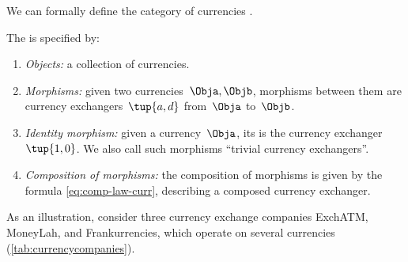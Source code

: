 We can formally define the category of currencies \Curr.

\begin{definition}
    \label{def:Curr}
    The  \Curr is specified by:
    \begin{enumerate}
        \item \emph{Objects:} a collection of currencies.
        \item \emph{Morphisms:} given two currencies~$\Obja, \Objb$, morphisms between them are currency exchangers~$\tup{a,d}$ from~$\Obja$ to~$\Objb$.
        \item \emph{Identity morphism:} given a currency~$\Obja$, its  is the currency exchanger~$\tup{1,0}$.
              We also call such morphisms ``trivial currency exchangers''.
        \item \emph{Composition of morphisms:} the composition of morphisms is given by the formula \cref{eq:comp-law-curr}, describing a composed currency exchanger.
    \end{enumerate}
\end{definition}

As an illustration, consider three currency exchange companies ExchATM, MoneyLah, and Frankurrencies, which operate on several currencies (\cref{tab:currencycompanies}).

